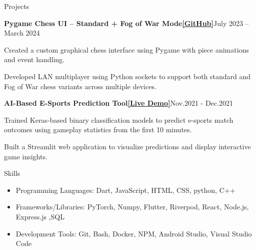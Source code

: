 \documentclass{resume} %
\begin{document}
\begin{rSection}{Projects}
        \begin{rSubsection}{\bf Pygame Chess UI – Standard + Fog of War Mode\href{https://github.com/wsxxs2222/chess_game}{[GitHub]}}{July 2023 -- March 2024}{}{ }
            \item{Created a custom graphical chess interface using Pygame with piece animations and event handling.}
            \item{Developed LAN multiplayer using Python sockets to support both standard and Fog of War chess variants across multiple devices.}
        \end{rSubsection}
    
        \begin{rSubsection}{\bf AI-Based E-Sports Prediction Tool\href{https://math10finalproject-k63yumzsdperqx7hdd2pww.streamlit.app/}{[Live Demo]}}{Nov.2021 - Dec.2021}{}{}
            \item {Trained Keras-based binary classification models to predict e-sports match outcomes using gameplay statistics from the first 10 minutes.}
            \item{Built a Streamlit web application to visualize predictions and display interactive game insights.}
        \end{rSubsection}
    \end{rSection}

    \begin{rSection}{Skills}
	\begin{itemize}
	    \item Programming Languages: Dart, JavaScript, HTML, CSS, python, C++
        \item Frameworks/Libraries: PyTorch, Numpy, Flutter, Riverpod, React, Node.js, Express.js ,SQL
        \item Development Tools: Git, Bash, Docker, NPM, Android Studio, Visual Studio Code
        
	\end{itemize}
		
	\end{rSection}
	
\end{document}
